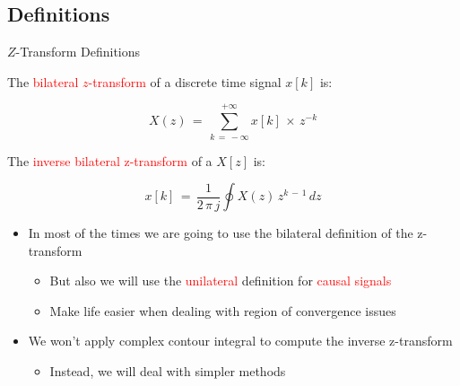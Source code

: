 \documentclass{beamer}
\begin{document}
\subsection{Definitions}
\begin{frame}[t,allowframebreaks]{$Z$-Transform Definitions}

\begin{definition}

The \textcolor{red}{bilateral $z$-transform} of a discrete time signal $x[k]$ is:

\begin{equation}
X(z) \, = \, \displaystyle\sum_{k \, = \, - \infty}^{+ \infty} x[k] \, \times \, z^{-k} 
\end{equation}

\end{definition}

\begin{definition}

The \textcolor{red}{inverse bilateral z-transform} of a $X[z]$ is:

\begin{equation}
x[k] \, = \, \displaystyle\frac{1}{2 \, \pi \, j} \displaystyle\oint X(z) \, z^{k \, - \, 1} \, dz
\end{equation}

\end{definition}

\newpage
\begin{itemize}

\item In most of the times we are going to use the bilateral definition of the z-transform

	\begin{itemize}
	\item But also we will use the \textcolor{red}{unilateral} definition for \textcolor{red}{causal signals}
	
	\item Make life easier when dealing with region of convergence issues
	\end{itemize}

\item We won't apply complex contour integral to compute the inverse z-transform

	\begin{itemize}
	\item Instead, we will deal with simpler methods 
	\end{itemize}

\end{itemize}

\end{frame}
\end{document}
